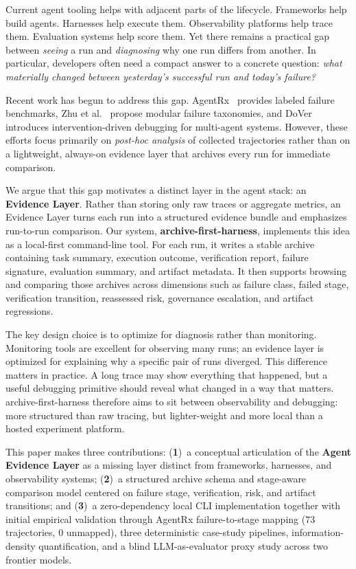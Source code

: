 \documentclass[11pt]{article}
\begin{document}
Current agent tooling helps with adjacent parts of the lifecycle. Frameworks help build agents. Harnesses help execute them. Observability platforms help trace them. Evaluation systems help score them. Yet there remains a practical gap between \emph{seeing} a run and \emph{diagnosing} why one run differs from another. In particular, developers often need a compact answer to a concrete question: \emph{what materially changed between yesterday's successful run and today's failure?}

Recent work has begun to address this gap. AgentRx~\cite{barke2026agentrx} provides labeled failure benchmarks, Zhu et al.~\cite{zhu2025agentdebug} propose modular failure taxonomies, and DoVer~\cite{ma2025dover} introduces intervention-driven debugging for multi-agent systems. However, these efforts focus primarily on \emph{post-hoc analysis} of collected trajectories rather than on a lightweight, always-on evidence layer that archives every run for immediate comparison.

We argue that this gap motivates a distinct layer in the agent stack: an \textbf{Evidence Layer}. Rather than storing only raw traces or aggregate metrics, an Evidence Layer turns each run into a structured evidence bundle and emphasizes run-to-run comparison. Our system, \textbf{archive-first-harness}, implements this idea as a local-first command-line tool. For each run, it writes a stable archive containing task summary, execution outcome, verification report, failure signature, evaluation summary, and artifact metadata. It then supports browsing and comparing those archives across dimensions such as failure class, failed stage, verification transition, reassessed risk, governance escalation, and artifact regressions.

The key design choice is to optimize for diagnosis rather than monitoring. Monitoring tools are excellent for observing many runs; an evidence layer is optimized for explaining why a specific pair of runs diverged. This difference matters in practice. A long trace may show everything that happened, but a useful debugging primitive should reveal what changed in a way that matters. archive-first-harness therefore aims to sit between observability and debugging: more structured than raw tracing, but lighter-weight and more local than a hosted experiment platform.

This paper makes three contributions: (\textbf{1})~a conceptual articulation of the \textbf{Agent Evidence Layer} as a missing layer distinct from frameworks, harnesses, and observability systems; (\textbf{2})~a structured archive schema and stage-aware comparison model centered on failure stage, verification, risk, and artifact transitions; and (\textbf{3})~a zero-dependency local CLI implementation together with initial empirical validation through AgentRx failure-to-stage mapping (73 trajectories, 0 unmapped), three deterministic case-study pipelines, information-density quantification, and a blind LLM-as-evaluator proxy study across two frontier models.
\end{document}

